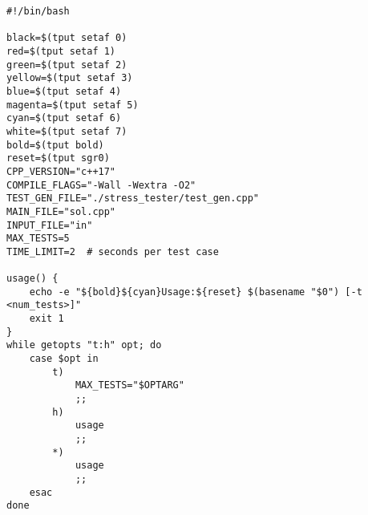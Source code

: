 \begin{lstlisting}[style=bashstyle]
#!/bin/bash

black=$(tput setaf 0)
red=$(tput setaf 1)
green=$(tput setaf 2)
yellow=$(tput setaf 3)
blue=$(tput setaf 4)
magenta=$(tput setaf 5)
cyan=$(tput setaf 6)
white=$(tput setaf 7)
bold=$(tput bold)
reset=$(tput sgr0)
CPP_VERSION="c++17"
COMPILE_FLAGS="-Wall -Wextra -O2"
TEST_GEN_FILE="./stress_tester/test_gen.cpp"
MAIN_FILE="sol.cpp"
INPUT_FILE="in"
MAX_TESTS=5
TIME_LIMIT=2  # seconds per test case

usage() {
    echo -e "${bold}${cyan}Usage:${reset} $(basename "$0") [-t <num_tests>]"
    exit 1
}
while getopts "t:h" opt; do
    case $opt in
        t)
            MAX_TESTS="$OPTARG"
            ;;
        h)
            usage
            ;;
        *)
            usage
            ;;
    esac
done


\end{lstlisting}

